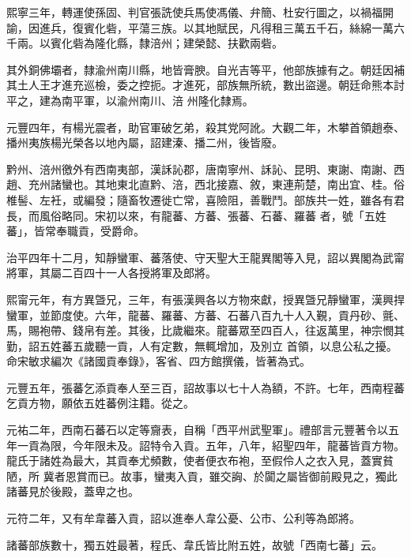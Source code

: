 \begin{pinyinscope}
 熙寧三年，轉運使孫固、判官張詵使兵馬使馮儀、弁簡、杜安行圖之，以禍福開諭，因進兵，復賓化砦，平蕩三族。以其地賦民，凡得租三萬五千石，絲綿一萬六千兩。以賓化砦為隆化縣，隸涪州；建榮懿、扶歡兩砦。



 其外銅佛壩者，隸渝州南川縣，地皆膏腴。自光吉等平，他部族據有之。朝廷因補其土人王才進充巡檢，委之控扼。才進死，部族無所統，數出盜邊。朝廷命熊本討平之，建為南平軍，以渝州南川、涪
 州隆化隸焉。



 元豐四年，有楊光震者，助官軍破乞弟，殺其党阿訛。大觀二年，木攀首領趙泰、播州夷族楊光榮各以地內屬，詔建溱、播二州，後皆廢。



 黔州、涪州徼外有西南夷部，漢訸訫郡，唐南寧州、訸訫、昆明、東謝、南謝、西趙、充州諸蠻也。其地東北直黔、涪，西北接嘉、敘，東連荊楚，南出宜、桂。俗椎髻、左衽，或編發；隨畜牧遷徙亡常，喜險阻，善戰鬥。部族共一姓，雖各有君長，而風俗略同。宋初以來，有龍蕃、方蕃、張蕃、石蕃、羅蕃
 者，號「五姓蕃」，皆常奉職貢，受爵命。



 治平四年十二月，知靜蠻軍、蕃落使、守天聖大王龍異閣等入見，詔以異閣為武甯將軍，其屬二百四十一人各授將軍及郎將。



 熙甯元年，有方異曁兄，三年，有張漢興各以方物來獻，授異曁兄靜蠻軍，漢興捍蠻軍，並節度使。六年，龍蕃、羅蕃、方蕃、石蕃八百九十人入覲，貢丹砂、氈、馬，賜袍帶、錢帛有差。其後，比歲繼來。龍蕃眾至四百人，往返萬里，神宗憫其勤，詔五姓蕃五歲聽一貢，人有定數，無輒增加，及別立
 首領，以息公私之擾。命宋敏求編次《諸國貢奉錄》，客省、四方館撰儀，皆著為式。



 元豐五年，張蕃乞添貢奉人至三百，詔故事以七十人為額，不許。七年，西南程蕃乞貢方物，願依五姓蕃例注籍。從之。



 元祐二年，西南石蕃石以定等齎表，自稱「西平州武聖軍」。禮部言元豐著令以五年一貢為限，今年限未及。詔特令入貢。五年，八年，紹聖四年，龍蕃皆貢方物。龍氏于諸姓為最大，其貢奉尤頻數，使者便衣布袍，至假伶人之衣入見，蓋實貧陋，所
 冀者恩賞而已。故事，蠻夷入貢，雖交詾、於闐之屬皆御前殿見之，獨此諸蕃見於後殿，蓋卑之也。



 元符二年，又有牟韋蕃入貢，詔以進奉人韋公憂、公市、公利等為郎將。



 諸蕃部族數十，獨五姓最著，程氏、韋氏皆比附五姓，故號「西南七蕃」云。




\end{pinyinscope}
